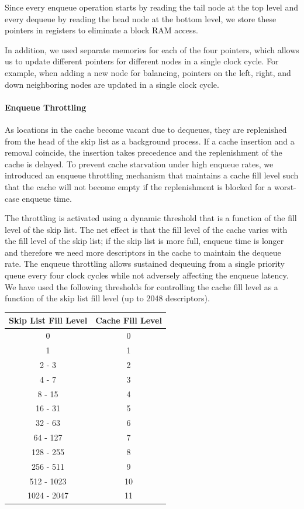 Since every enqueue operation starts by reading the tail node at the top level and every dequeue by reading the head node at the bottom level, we store these pointers in registers to eliminate a block RAM access.

In addition, we used separate memories for each of the four pointers, which allows us to update different pointers for different nodes in a single clock cycle.  For example, when adding a new node for balancing, pointers on the left, right, and down neighboring nodes are updated in a single clock cycle.

\paragraph{Enqueue Throttling}\label{enq-throttle}
As locations in the cache become vacant due to dequeues, they are replenished from the head of the skip list as a background process.  If a cache insertion and a removal coincide, the insertion takes precedence and the replenishment of the cache is delayed.  To prevent cache starvation under high enqueue rates, we introduced an enqueue throttling mechanism that maintains a cache fill level such that the cache will not become empty if the replenishment is blocked for a worst-case enqueue time.  

The throttling is activated using a dynamic threshold that is a function of the fill level of the skip list.  The net effect is that the fill level of the cache varies with the fill level of the skip list; if the skip list is more full, enqueue time is longer and therefore we need more descriptors in the cache to maintain the dequeue rate.  The enqueue throttling allows sustained dequeuing from a single priority queue every four clock cycles while not adversely affecting the enqueue latency. We have used the following thresholds for controlling the cache fill level as a function of the skip list fill level (up to 2048 descriptors).

\begin{center}
\begin{tabular}{|c|c|}
    \hline
    \textbf{Skip List Fill Level} & \textbf{Cache Fill Level} \\
    \hline
    0 & 0\\
    \hline
    1 & 1\\
    \hline
    2 - 3 & 2\\
    \hline
    4 - 7 & 3\\
    \hline
    8 - 15 & 4\\
    \hline
    16 - 31 & 5\\
    \hline
    32 - 63 & 6\\
    \hline
    64 - 127 & 7\\
    \hline
    128 - 255 & 8\\
    \hline
    256 - 511 & 9\\
    \hline
    512 - 1023 & 10\\
    \hline
    1024 - 2047 & 11\\
    \hline
\end{tabular}
\end{center}

